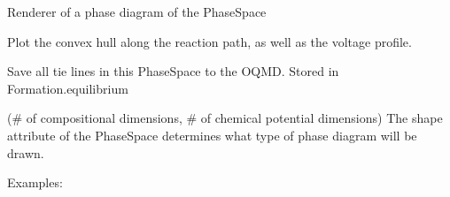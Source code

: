 \documentclass[letterpaper,10pt,english]{sphinxmanual}
\begin{document}
\begin{fulllineitems}
\begin{fulllineitems}
\end{fulllineitems}


\begin{fulllineitems}
\label{models:qmpy.PhaseSpace.phase_diagram}
Renderer of a phase diagram of the PhaseSpace

\end{fulllineitems}


\begin{fulllineitems}
\label{models:qmpy.PhaseSpace.plot_reactions}
Plot the convex hull along the reaction path, as well as the voltage
profile.

\end{fulllineitems}


\begin{fulllineitems}
\label{models:qmpy.PhaseSpace.save_tie_lines}
Save all tie lines in this PhaseSpace to the OQMD. Stored in
Formation.equilibrium

\end{fulllineitems}


\begin{fulllineitems}
\label{models:qmpy.PhaseSpace.shape}
(\# of compositional dimensions, \# of chemical potential dimensions)
The shape attribute of the PhaseSpace determines what type of phase
diagram will be drawn.

Examples:


\end{fulllineitems}
\end{fulllineitems}
\end{document}

